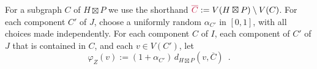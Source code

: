 \documentclass{patmorin}
\makeatletter
\renewcommand{\ge}{\geqslant}
\def\mathcolor#1#{\@mathcolor{#1}}
\def\@mathcolor#1#2#3{%
  \protect\leavevmode
  \begingroup
    \color#1{#2}#3%
  \endgroup
}
\newcommand{\mathdefin}[1]{\mathcolor{brightmaroon}{#1}}
\makeatother
\begin{document}
%
%
%

For a subgraph $C$ of $H\boxtimes P$ we use the shorthand $\mathdefin{\overline{C}}:=V(H\boxtimes P)\setminus V(C)$.
For each component $C'$ of $J$, choose a uniformly random $\alpha_{C'}$ in $[0,1]$, with all choices made independently.
For each component $C$ of $I$, each component of $C'$ of $J$ that is contained in $C$, and each $v \in V(C')$, let
\[
  \varphi_{Z}(v):=(1+\alpha_{C'})\,d_{H\boxtimes P}(v,\overline{C}) \enspace .
\]
\end{document}
